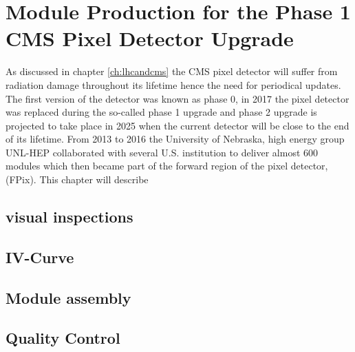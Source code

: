 \chapter{Module Production for the Phase 1 CMS Pixel Detector Upgrade}\label{ch:phase1}

As discussed in chapter \ref{ch:lhcandcms} the CMS pixel detector will suffer from radiation damage throughout its lifetime hence the need for periodical updates. The first version of the detector was known as phase 0, in 2017 the pixel detector was replaced during the so-called phase 1 upgrade and phase 2 upgrade is projected to take place in 2025\cite{pixels_plans} when the current detector will be close to the end of its lifetime. From 2013 to 2016 the University of Nebraska, high energy group UNL-HEP collaborated with several U.S. institution to deliver almost 600 modules which then became part of the forward region of the pixel detector, (FPix). This chapter will describe  \cite{pixel_performance}

\section{visual inspections}
\section{IV-Curve}
\section{Module assembly}
\section{Quality Control}